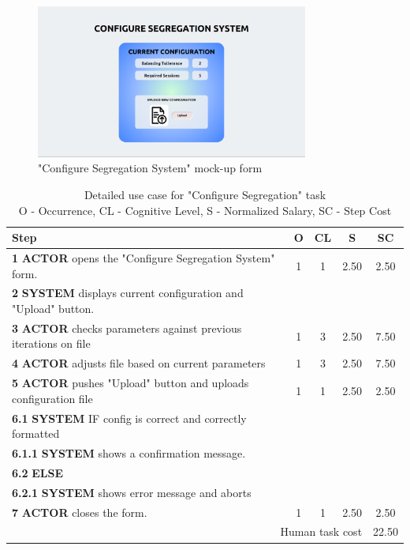 \begin{figure}[H]
\centering
\includegraphics[width=0.8\textwidth]{figures/ui_configure_segregation.png}
\caption{"Configure Segregation System" mock-up form}
\end{figure}

\begin{table}[H]
\centering
\begin{tabularx}{\textwidth}{|X|c|c|c|c|}
\hline
\textbf{Step} & \textbf{O} & \textbf{CL} & \textbf{S} & \textbf{SC} \\
\hline
\textbf{1} \textbf{ACTOR} opens the "Configure Segregation System" form. &  1 & 1 & 2.50 & 2.50 \\
\hline
\textbf{2} \textbf{SYSTEM} displays current configuration and "Upload" button. & & & & \\
\hline
\textbf{3} \textbf{ACTOR} checks parameters against previous iterations on file & 1 & 3 & 2.50 & 7.50 \\
\hline
\textbf{4} \textbf{ACTOR} adjusts file based on current parameters & 1 & 3 & 2.50 & 7.50 \\
\hline
\textbf{5} \textbf{ACTOR} pushes "Upload" button and uploads configuration file & 1 & 1 & 2.50 & 2.50 \\
\hline
\textbf{6.1} \textbf{SYSTEM} IF config is correct and correctly formatted & & & & \\
\hline
\textbf{6.1.1} \textbf{SYSTEM} shows a confirmation message. & & & & \\
\hline
\textbf{6.2} \textbf{ELSE} & & & & \\
\hline
\textbf{6.2.1} \textbf{SYSTEM} shows error message and aborts & & & & \\
\hline
\textbf{7} \textbf{ACTOR} closes the form. & 1 & 1 & 2.50 & 2.50 \\
\hline
\multicolumn{4}{|r|}{Human task cost} & 22.50 \\
\hline
\end{tabularx}
\caption{Detailed use case for "Configure Segregation" task\\ 
O - Occurrence, CL - Cognitive Level, S - Normalized Salary, SC - Step Cost}
\label{table:configure_segregation_system}
\end{table}

